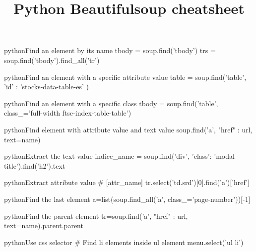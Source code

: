 \documentclass[10pt,a4paper]{article}
\title{\color{w3schools}Python Beautifulsoup cheatsheet
}
\begin{document}
\maketitle

\small
\begin{multicols}{3}

\thispagestyle{empty}
\scriptsize



\begin{codebox}{python}{Find an element by its name}
tbody = soup.find('tbody')
trs = soup.find('tbody').find_all('tr')

\end{codebox}

\begin{codebox}{python}{Find an element with a specific attribute value}
table = soup.find('table', {'id' : 'stocks-data-table-es'} )

\end{codebox}

\begin{codebox}{python}{Find an element with a specific class}
tbody = soup.find('table', class_='full-width ftse-index-table-table')

\end{codebox}

\begin{codebox}{python}{Find element with attribute value and text value}
soup.find('a', {"href" : url}, text=name)

\end{codebox}

\begin{codebox}{python}{Extract the text value}
indice_name = soup.find('div', {'class': 'modal-title'}).find('h2').text

\end{codebox}

\begin{codebox}{python}{Extract attribute value}
# [attr_name]
tr.select('td.srd')[0].find('a')['href']

\end{codebox}

\begin{codebox}{python}{Find the last element}
a=list(soup.find_all('a', class_='page-number'))[-1]

\end{codebox}

\begin{codebox}{python}{Find the parent element}
tr=soup.find('a', {"href" : url}, text=name).parent.parent

\end{codebox}

\begin{codebox}{python}{Use css selector}
# Find li elements inside ul element
menu.select('ul li')

\end{codebox}


\AtNextBibliography{\footnotesize}
\printbibliography  
\end{multicols}
\end{document}
